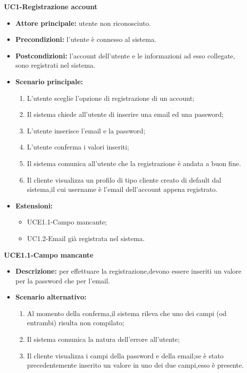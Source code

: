 \textbf{UC1-Registrazione account}
\begin{itemize}
    \item \textbf{Attore principale: }utente non riconosciuto.
    \item \textbf{Precondizioni: }l'utente è connesso al sistema.
    \item \textbf{Postcondizioni: }l'account dell'utente e le informazioni ad esso collegate, sono registrati nel sistema.
    \item \textbf{Scenario principale:} 
        \begin{enumerate}
            \item L'utente sceglie l'opzione di registrazione di un account;
            \item Il sistema chiede all'utente di inserire una email ed una password;
            \item L'utente inserisce l'email e la password;
            \item L'utente conferma i valori inseriti;
            \item Il sistema comunica all'utente che la registrazione è andata 
            a buon fine.
            \item Il cliente visualizza un profilo di tipo cliente creato di default dal sistema,il cui username è l'email dell'account appena registrato.
        \end{enumerate}
    \item \textbf{Estensioni:}
        \begin{itemize}
                \item UCE1.1-Campo mancante;
                \item UC1.2-Email già registrata nel sistema.
        \end{itemize}
\end{itemize}
    
\textbf{UCE1.1-Campo mancante}
\begin{itemize}
    \item \textbf{Descrizione: }per effettuare la registrazione,devono essere inseriti un valore per la password che per l'email.
    \item \textbf{Scenario alternativo:}
    \begin{enumerate}
        \item Al momento della conferma,il sistema rileva che uno dei campi (od entrambi) risulta non compilato;
        \item Il sistema comunica la natura dell'errore all'utente;
        \item Il cliente visualizza i campi della password e della email;se è stato precedentemente inserito un valore in uno
        dei due campi,esso è presente.
    \end{enumerate}
\end{itemize}

